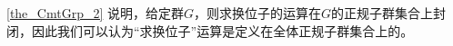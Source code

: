 




\autoref{the_CmtGrp_2} 说明，给定群$G$，则求换位子的运算在$G$的正规子群集合上封闭，因此我们可以认为“求换位子”运算是定义在全体正规子群集合上的。







































